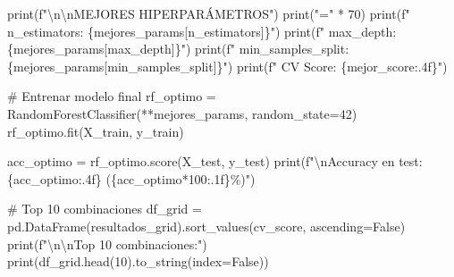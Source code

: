 \documentclass[
  doc,
  floatsintext,
  longtable,
  a4paper,
  nolmodern,
  notxfonts,
  notimes,
  12pt,
  colorlinks=true,linkcolor=blue,citecolor=blue,urlcolor=blue]{apa7}
\newenvironment{Shaded}{\begin{snugshade}}{\end{snugshade}}
\newcommand{\BuiltInTok}[1]{\textcolor[rgb]{0.00,0.23,0.31}{#1}}
\newcommand{\CharTok}[1]{\textcolor[rgb]{0.13,0.47,0.30}{#1}}
\newcommand{\CommentTok}[1]{\textcolor[rgb]{0.37,0.37,0.37}{#1}}
\newcommand{\DecValTok}[1]{\textcolor[rgb]{0.68,0.00,0.00}{#1}}
\newcommand{\NormalTok}[1]{\textcolor[rgb]{0.00,0.23,0.31}{#1}}
\newcommand{\OperatorTok}[1]{\textcolor[rgb]{0.37,0.37,0.37}{#1}}
\newcommand{\SpecialCharTok}[1]{\textcolor[rgb]{0.37,0.37,0.37}{#1}}
\newcommand{\SpecialStringTok}[1]{\textcolor[rgb]{0.13,0.47,0.30}{#1}}
\newcommand{\StringTok}[1]{\textcolor[rgb]{0.13,0.47,0.30}{#1}}
\newcommand{\VariableTok}[1]{\textcolor[rgb]{0.07,0.07,0.07}{#1}}
\begin{document}
\begin{Shaded}
\begin{Highlighting}[]
\BuiltInTok{print}\NormalTok{(}\SpecialStringTok{f"}\CharTok{\textbackslash{}n\textbackslash{}n}\SpecialStringTok{MEJORES HIPERPARÁMETROS"}\NormalTok{)}
\BuiltInTok{print}\NormalTok{(}\StringTok{"="} \OperatorTok{*} \DecValTok{70}\NormalTok{)}
\BuiltInTok{print}\NormalTok{(}\SpecialStringTok{f"  n\_estimators: }\SpecialCharTok{\{}\NormalTok{mejores\_params[}\StringTok{\textquotesingle{}n\_estimators\textquotesingle{}}\NormalTok{]}\SpecialCharTok{\}}\SpecialStringTok{"}\NormalTok{)}
\BuiltInTok{print}\NormalTok{(}\SpecialStringTok{f"  max\_depth: }\SpecialCharTok{\{}\NormalTok{mejores\_params[}\StringTok{\textquotesingle{}max\_depth\textquotesingle{}}\NormalTok{]}\SpecialCharTok{\}}\SpecialStringTok{"}\NormalTok{)}
\BuiltInTok{print}\NormalTok{(}\SpecialStringTok{f"  min\_samples\_split: }\SpecialCharTok{\{}\NormalTok{mejores\_params[}\StringTok{\textquotesingle{}min\_samples\_split\textquotesingle{}}\NormalTok{]}\SpecialCharTok{\}}\SpecialStringTok{"}\NormalTok{)}
\BuiltInTok{print}\NormalTok{(}\SpecialStringTok{f"  CV Score: }\SpecialCharTok{\{}\NormalTok{mejor\_score}\SpecialCharTok{:.4f\}}\SpecialStringTok{"}\NormalTok{)}

\CommentTok{\# Entrenar modelo final}
\NormalTok{rf\_optimo }\OperatorTok{=}\NormalTok{ RandomForestClassifier(}\OperatorTok{**}\NormalTok{mejores\_params, random\_state}\OperatorTok{=}\DecValTok{42}\NormalTok{)}
\NormalTok{rf\_optimo.fit(X\_train, y\_train)}

\NormalTok{acc\_optimo }\OperatorTok{=}\NormalTok{ rf\_optimo.score(X\_test, y\_test)}
\BuiltInTok{print}\NormalTok{(}\SpecialStringTok{f"}\CharTok{\textbackslash{}n}\SpecialStringTok{Accuracy en test: }\SpecialCharTok{\{}\NormalTok{acc\_optimo}\SpecialCharTok{:.4f\}}\SpecialStringTok{ (}\SpecialCharTok{\{}\NormalTok{acc\_optimo}\OperatorTok{*}\DecValTok{100}\SpecialCharTok{:.1f\}}\SpecialStringTok{\%)"}\NormalTok{)}

\CommentTok{\# Top 10 combinaciones}
\NormalTok{df\_grid }\OperatorTok{=}\NormalTok{ pd.DataFrame(resultados\_grid).sort\_values(}\StringTok{\textquotesingle{}cv\_score\textquotesingle{}}\NormalTok{, ascending}\OperatorTok{=}\VariableTok{False}\NormalTok{)}
\BuiltInTok{print}\NormalTok{(}\SpecialStringTok{f"}\CharTok{\textbackslash{}n\textbackslash{}n}\SpecialStringTok{Top 10 combinaciones:"}\NormalTok{)}
\BuiltInTok{print}\NormalTok{(df\_grid.head(}\DecValTok{10}\NormalTok{).to\_string(index}\OperatorTok{=}\VariableTok{False}\NormalTok{))}
\end{Highlighting}
\end{Shaded}
\end{document}
